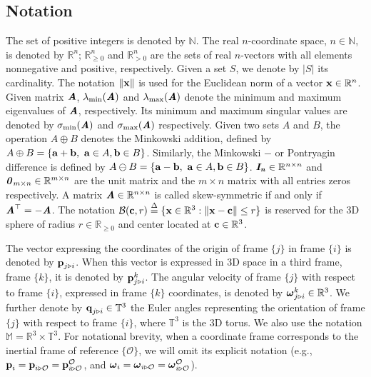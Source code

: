 \subsection{Notation}

The set of positive integers is denoted by $\mathbb{N}$. The real $n$-coordinate
space, $n\in\mathbb{N}$, is denoted by $\mathbb{R}^n$;
$\mathbb{R}^n_{\geq 0}$ and $\mathbb{R}^n_{> 0}$ are the sets of real
$n$-vectors with all elements nonnegative and positive, respectively. Given a
set $S$, we denote by $\lvert S\lvert$ its cardinality. The notation
$\|\bm{\mathbf{x}}\|$ is used for the Euclidean norm of a vector
$\bm{\mathbf{x}} \in \mathbb{R}^n$. Given matrix $\bm{\mathit{A}}$, $\lambda_{\text{min}}(\bm{\mathit{A}})$
and $\lambda_{\text{max}}(\bm{\mathit{A}})$
denote the minimum and maximum eigenvalues of $\bm{\mathit{A}}$, respectively.
Its minimum and maximum singular values are denoted by
$\sigma_{\text{min}}(\bm{\mathit{A}})$ and $\sigma_{\text{max}}(\bm{\mathit{A}})$ respectively.
Given two sets $A$ and $B$, the operation $A \oplus B$ denotes the Minkowski
addition, defined by
$A \oplus B = \{\bm{\mathbf{a}} + \bm{\mathbf{b}},\ \bm{\mathbf{a}} \in A, \bm{\mathbf{b}} \in B\}$. Similarly,
the Minkowski $-$ or Pontryagin difference is defined by
$A \ominus B = \{\bm{\mathbf{a}} - \bm{\mathbf{b}},\ \bm{\mathbf{a}} \in A, \bm{\mathbf{b}} \in B\}$.
$\bm{\mathit{I_n}} \in \mathbb{R}^{n \times n}$ and
$\bm{\mathit{0}}_{m \times n} \in \mathbb{R}^{m \times n}$
are the unit matrix and the $m \times n$ matrix with all entries zeros
respectively.  A matrix $\bm{\mathit{A}} \in \mathbb{R}^{n \times n}$ is called
skew-symmetric if and only if $\bm{\mathit{A}}^\top = -\bm{\mathit{A}}$. The notation
$\mathcal{B}(\bm{\mathbf{c}},r) \overset{\Delta}{=} \{\bm{\mathbf{x}} \in \mathbb{R}^3: \|\bm{\mathbf{x}}-\bm{\mathbf{c}}\| \leq r\}$
is reserved for the 3D sphere of radius $r \in \mathbb{R}_{\ge 0}$ and center
located at $\bm{\mathbf{c}}\in\mathbb{R}^{3}$.

The vector expressing the coordinates of the origin of frame $\{j\}$ in
frame $\{i\}$ is denoted by $\bm{\mathbf{p}}_{j \triangleright i}$. When this vector is
expressed in 3D space in a third frame, frame $\{k\}$, it is denoted by
$\bm{\mathbf{p}}_{j \triangleright i}^{k}$.
The angular velocity of frame $\{j\}$ with respect to frame $\{i\}$, expressed
in frame $\{k\}$ coordinates, is denoted by
$\bm{\mathbf{\omega}}^k_{j \triangleright i}\in \mathbb{R}^{3}$.
We further denote by $\bm{\mathbf{q}}_{j \triangleright i} \in \mathbb{T}^3$
the Euler angles representing the orientation of frame $\{j\}$ with respect to
frame $\{i\}$, where $\mathbb{T}^3$ is the $3$D torus.
We also use the notation $\mathbb{M} = \mathbb{R}^3\times \mathbb{T}^3$.
For notational brevity, when a coordinate frame corresponds to the inertial frame
of reference $\{\mathcal{O}\}$, we will omit its explicit notation
(e.g., $\bm{\mathbf{p}}_i = \bm{\mathbf{p}}_{i \triangleright \mathcal{O}} = \bm{\mathbf{p}}^\mathcal{O}_{i \triangleright \mathcal{O}}$, and
$\bm{\mathbf{\omega}}_i = \bm{\mathbf{\omega}}_{i \triangleright \mathcal{O}} = \bm{\mathbf{\omega}}^\mathcal{O}_{i \triangleright \mathcal{O}}$).
